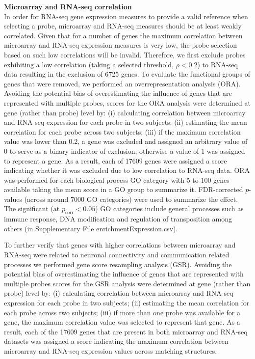 \textbf{Microarray and RNA-seq correlation}\\
In order for RNA-seq gene expression measures to provide a valid reference when selecting a probe, microarray and RNA-seq measures should be at least weakly correlated. Given that for a number of genes the maximum correlation between microarray and RNA-seq expression measures is very low, the probe selection based on such low correlations will be invalid. Therefore, we first exclude probes exhibiting a low correlation (taking a selected threshold, $\rho < 0.2$) to RNA-seq data resulting in the exclusion of \num{6725} genes. To evaluate the functional groups of genes that were removed, we performed an overrepresentation analysis (ORA). Avoiding the potential bias of overestimating the influence of genes that are represented with multiple probes, scores for the ORA analysis were determined at gene (rather than probe) level by: (i) calculating correlation between microarray and RNA-seq expression for each probe in two subjects; (ii) estimating the mean correlation for each probe across two subjects; (iii) if the maximum correlation value was lower than 0.2, a gene was excluded and assigned an arbitrary value of 0 to serve as a binary indicator of exclusion; otherwise a value of 1 was assigned to represent a gene. As a result, each of \num{17609} genes were assigned a score indicating whether it was excluded due to low correlation to RNA-seq data. ORA was performed for each biological process GO category with 5 to 100 genes available taking the mean score in a GO group to summarize it. FDR-corrected $p$-values (across around \num{7000} GO categories) were used to summarize the effect. The significant (at $p_\mathrm{corr}<0.05$) GO categories include general processes such as immune response, DNA modification and regulation of transposition among others (in Supplementary File enrichmentExpression.csv).

To further verify that genes with higher correlations between microarray and RNA-seq were related to neuronal connectivity and communication related processes we performed gene score resampling analysis (GSR). Avoiding the potential bias of overestimating the influence of genes that are represented with multiple probes scores for the GSR analysis were determined at gene (rather than probe) level by: (i) calculating correlation between microarray and RNA-seq expression for each probe in two subjects; (ii) estimating the mean correlation for each probe across two subjects; (iii) if more than one probe was available for a gene, the maximum correlation value was selected to represent that gene. As a result, each of the \num{17609} genes that are present in both microarray and RNA-seq datasets was assigned a score indicating the maximum correlation between microarray and RNA-seq expression values across matching structures.

